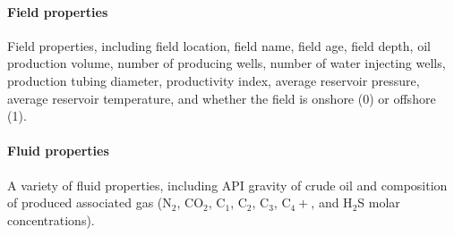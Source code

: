 \documentclass[11pt]{report}
\newcommand{\marg}[1]{{\footnotesize\textit{\textcolor{stanford}{'#1'}}}}
\newcommand{\marginnote}[1]{\marginpar{\marg{#1}}}
\begin{document}
\paragraph{Field properties} Field properties, including field location, \marginnote{Inputs 1.2} field name, field age, field depth, oil production volume, number of producing wells, number of water injecting wells, production tubing diameter, productivity index, average reservoir pressure, average reservoir temperature, and whether the field is onshore (0) or offshore (1).

\paragraph{Fluid properties} A variety of fluid properties, including \marginnote{Inputs 1.3} API gravity of crude oil and composition of produced associated gas (N$_2$, CO$_2$, C$_1$, C$_2$, C$_3$, C$_4+$, and H$_2$S molar concentrations). 
\end{document}
